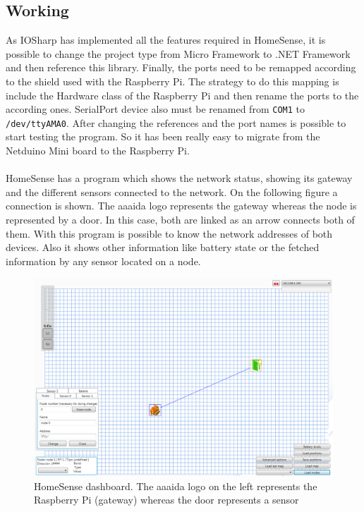 \subsection{Working}\label{SS:IOEx-HomeSense-Working}
As IOSharp has implemented all the features required in HomeSense, it is possible to change the project type from Micro Framework to .NET Framework and then reference this library. Finally, the ports need to be remapped according to the shield used with the Raspberry Pi. The strategy to do this mapping is include the Hardware class of the Raspberry Pi and then rename the ports to the according ones. SerialPort device also must be renamed from \verb!COM1! to \verb!/dev/ttyAMA0!. After changing the references and the port names is possible to start testing the program. So it has been really easy to migrate from the Netduino Mini board to the Raspberry Pi.
\\
\\
HomeSense has a program which shows the network status, showing its gateway and the different sensors connected to the network. On the following figure a connection is shown. The aaaida logo represents the gateway whereas the node is represented by a door. In this case, both are linked as an arrow connects both of them. With this program is possible to know the network addresses of both devices. Also it shows other information like battery state or the fetched information by any sensor located on a node.
\begin{figure}[H]\begin{center}
 \centering
  \captionsetup{justification=centering}
  \includegraphics[width=1\textwidth]{pictures/examples/homesense-pillin}
  \caption{HomeSense dashboard. The aaaida logo on the left represents the Raspberry Pi (gateway)  whereas the door represents a sensor\label{fig:IOEx-HS-Dash}}
\end{center}\end{figure}

